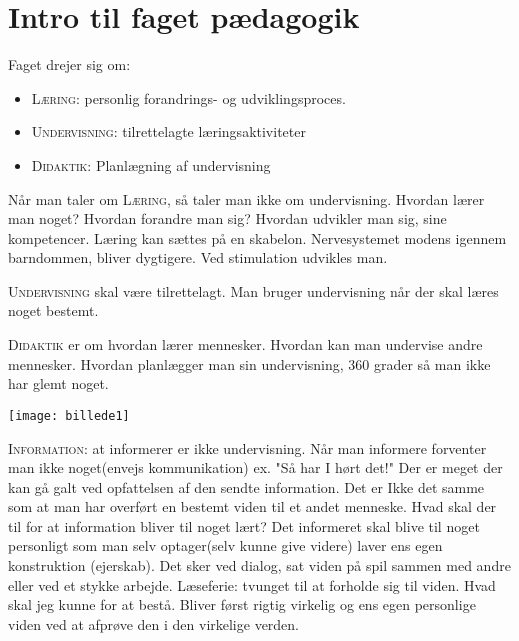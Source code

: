 \documentclass[12pt, letterpaper]{article}
\begin{document}
\section*{Intro til faget pædagogik}

Faget drejer sig om:
\begin{itemize}
\item \textsc {Læring}: personlig forandrings- og udviklingsproces.

\item \textsc {Undervisning}: tilrettelagte læringsaktiviteter

\item \textsc {Didaktik}: Planlægning af undervisning
\end{itemize}


Når man taler om \textsc {Læring}, så taler man ikke om undervisning. Hvordan lærer man noget? Hvordan forandre man sig? Hvordan udvikler man sig, sine kompetencer. Læring kan sættes på en skabelon. Nervesystemet modens igennem barndommen, bliver dygtigere. Ved stimulation udvikles man.\newline

\textsc {Undervisning} skal være tilrettelagt. 
Man bruger undervisning når der skal læres noget bestemt.\newline

\textsc {Didaktik} er om hvordan lærer mennesker. Hvordan kan man undervise andre mennesker. Hvordan planlægger man sin undervisning, 360 grader så man ikke har glemt noget.

\begin{center}
\texttt{[image: billede1]}
\end{center}


\textsc {Information}: at informerer er ikke undervisning. Når man informere forventer man ikke noget(envejs kommunikation) ex. "Så har I hørt det!" Der er meget der kan gå galt ved opfattelsen af den sendte information. Det er Ikke det samme som at man har overført en bestemt viden til et andet menneske. Hvad skal der til for at information bliver til noget lært? 
Det informeret skal blive til noget personligt som man selv optager(selv kunne give videre) laver ens egen konstruktion (ejerskab). Det sker ved dialog, sat viden på spil sammen med andre eller ved et stykke arbejde. Læseferie: tvunget til at forholde sig til viden. Hvad skal jeg kunne for at bestå. Bliver først rigtig virkelig og ens egen personlige viden ved at afprøve den i den virkelige verden. \newline
\end{document}
